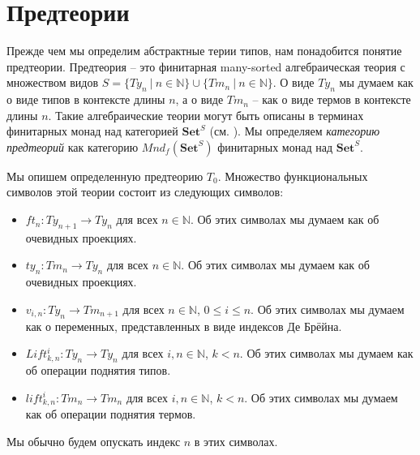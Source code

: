 \documentclass{amsart}
\theoremstyle{definition}
\theoremstyle{remark}
\newcommand{\cat}[1]{\mathbf{#1}}
\newcommand{\Set}{\cat{Set}}
\numberwithin{figure}{section}
\begin{document}
\section{Предтеории}

Прежде чем мы определим абстрактные терии типов, нам понадобится понятие предтеории.
Предтеория -- это финитарная many-sorted алгебраическая теория с множеством видов $S = \{ Ty_n\ |\ n \in \mathbb{N} \} \cup \{ Tm_n\ |\ n \in \mathbb{N} \}$.
О виде $Ty_n$ мы думаем как о виде типов в контексте длины $n$, а о виде $Tm_n$ -- как о виде термов в контексте длины $n$.
Такие алгебраические теории могут быть описаны в терминах финитарных монад над категорией $\Set^S$ (см. \cite{LPC}).
Мы определяем \emph{категорию предтеорий} как категорию $Mnd_f(\Set^S)$ финитарных монад над $\Set^S$.

Мы опишем определенную предтеорию $T_0$.
Множество функциональных символов этой теории состоит из следующих символов:
\begin{itemize}
\item $ft_n : Ty_{n+1} \to Ty_n$ для всех $n \in \mathbb{N}$. Об этих символах мы думаем как об очевидных проекциях.
\item $ty_n : Tm_n \to Ty_n$ для всех $n \in \mathbb{N}$. Об этих символах мы думаем как об очевидных проекциях.
\item $v_{i,n} : Ty_n \to Tm_{n+1}$ для всех $n \in \mathbb{N}$, $0 \leq i \leq n$. Об этих символах мы думаем как о переменных, представленных в виде индексов Де Брёйна.
\item $Lift^i_{k,n} : Ty_n \to Ty_n$ для всех $i, n \in \mathbb{N}$, $k < n$. Об этих символах мы думаем как об операции поднятия типов.
\item $lift^i_{k,n} : Tm_n \to Tm_n$ для всех $i, n \in \mathbb{N}$, $k < n$. Об этих символах мы думаем как об операции поднятия термов.
\end{itemize}
Мы обычно будем опускать индекс $n$ в этих символах.
\end{document}
